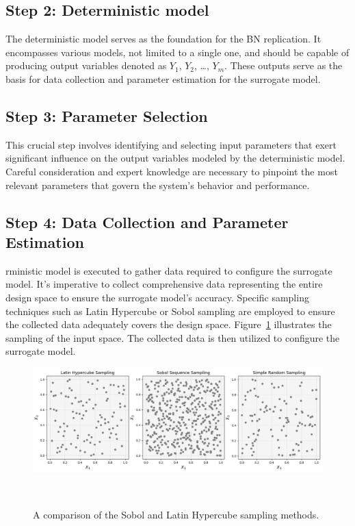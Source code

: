 \documentclass[journal]{IEEEtran}
\begin{document}
\subsection{\textbf{Step 2}: Deterministic model}\label{sec:deterministic}
The deterministic model serves as the foundation for the BN replication. It encompasses various models, not limited to a single one, and should be capable of producing output variables denoted as $Y_1$, $Y_2$, \ldots, $Y_m$. These outputs serve as the basis for data collection and parameter estimation for the surrogate model.

\subsection{\textbf{Step 3}: Parameter Selection}\label{sec:parameters} 
This crucial step involves identifying and selecting input parameters that exert significant influence on the output variables modeled by the deterministic model. Careful consideration and expert knowledge are necessary to pinpoint the most relevant parameters that govern the system's behavior and performance.


\subsection{\textbf{Step 4}: Data Collection and Parameter Estimation}\label{sec:data} 
rministic model is executed to gather data required to configure the surrogate model. It's imperative to collect comprehensive data representing the entire design space to ensure the surrogate model's accuracy. Specific sampling techniques such as Latin Hypercube or Sobol sampling are employed to ensure the collected data adequately covers the design space. Figure~\ref{fig:sobol_vs_lhs} illustrates the sampling of the input space. The collected data is then utilized to configure the surrogate model. 

\begin{figure}[ht]
    \centering
    \includegraphics[width=\textwidth]{figures/sobol_vs_lhs_simple.png}
    \caption{\small A comparison of the Sobol and Latin Hypercube sampling methods.}~\label{fig:sobol_vs_lhs}
\end{figure}
\end{document}
